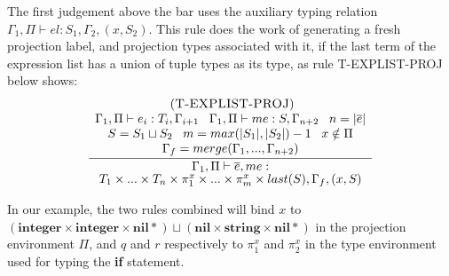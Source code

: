 \documentclass{sigplanconf}
\newcommand{\Nil}{\mathbf{nil}}
\newcommand{\Integer}{\mathbf{integer}}
\newcommand{\String}{\mathbf{string}}
\newcommand{\mylabel}[1]{\; (\textsc{#1})}
\newcommand{\env}{\Gamma}
\newcommand{\penv}{\Pi}
\begin{document}
The first judgement above the bar uses the auxiliary typing relation $\env_{1}, \penv \vdash el : S_{1}, \env_{2}, (x,S_{2})$.
This rule does the work of generating a fresh projection label,
and projection types associated with it, if the last term of
the expression list has a union of tuple types as its type,
as rule {\sc T-EXPLIST-PROJ} below shows:
\[
\begin{array}{c}
\mylabel{T-EXPLIST-PROJ}\\
\dfrac{\begin{array}{c}
	\env_{1}, \penv \vdash e_{i}:T_{i}, \env_{i+1} \;\;\;
	\env_{1}, \penv \vdash me:S, \env_{n+2} \;\;\; n=|\overline{e}|\\
	S = S_1 \sqcup S_2 \;\;\;m = max(|S_1|, |S_2|)-1 \;\;\; x \notin \Pi\\
	\env_{f} = merge(\env_{1}, ..., \env_{n+2})
	\end{array}}
{\env_{1}, \penv \vdash \overline{e},me:}\\ {T_{1} \times ... \times T_{n} \times \pi_{1}^{x} \times ... \times \pi_{m}^{x} \times last(S), \env_{f}, (x,S)}
\end{array}
\]

In our example, the two rules combined will bind $x$ to
$(\Integer \times \Integer \times \Nil{*}) \sqcup (\Nil \times \String \times \Nil{*})$ in the projection environment $\Pi$,
and $q$ and $r$ respectively to $\pi_{1}^{x}$ and $\pi_{2}^{x}$
in the type environment used for typing the {\bf if} statement.
\end{document}
